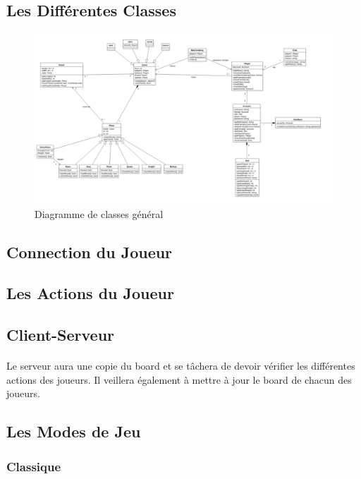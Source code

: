 \documentclass[10pt, a4paper]{article}
\begin{document}
\subsection{Les Différentes Classes}
	
\begin{figure}[p]
\includegraphics[scale=0.5]{ClassDiagram.png}
\caption{Diagramme de classes général}
\label{CD} %
\end{figure}

		
\subsection{Connection du Joueur}
		
\subsection{Les Actions du Joueur}

\subsection{Client-Serveur}
\paragraph{}Le serveur aura une copie du board et se tâchera de devoir vérifier les différentes actions des joueurs. Il veillera également à mettre à jour le board de chacun des joueurs.

\subsection{Les Modes de Jeu}
\subsubsection{Classique}
\end{document}
